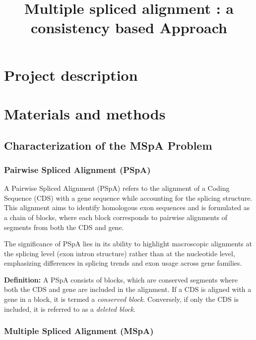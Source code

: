 \documentclass[12pt,oneside,letterpaper,english]{article}
\title{Multiple spliced alignment : a consistency based Approach} %
\begin{document}


\newpage
\doublespacing
\renewcommand{\baselinestretch}{1}\normalsize
\tableofcontents
\renewcommand{\baselinestretch}{1}\normalsize
\thispagestyle{fancy} %

\newpage
{} 

\section{Project description}
 

\section{Materials and methods}
\subsection{Characterization of the MSpA Problem}
\subsubsection{Pairwise Spliced Alignment (PSpA)}
A Pairwise Spliced Alignment (PSpA) refers to the alignment of a Coding Sequence (CDS) with a gene sequence while accounting for the splicing structure. This alignment aims to identify homologous exon sequences and is formulated as a chain of blocks, where each block corresponds to pairwise alignments of segments from both the CDS and gene. 

The significance of PSpA lies in its ability to highlight macroscopic alignments at the splicing level (exon intron structure) rather than at the nucleotide level, emphasizing differences in splicing trends and exon usage across gene families.

\textbf{Definition:} A PSpA consists of blocks, which are conserved segments where both the CDS and gene are included in the alignment. If a CDS is aligned with a gene in a block, it is termed a \textit{conserved block}. Conversely, if only the CDS is included, it is referred to as a \textit{deleted block}.

\subsubsection{Multiple Spliced Alignment (MSpA)}
\end{document}
